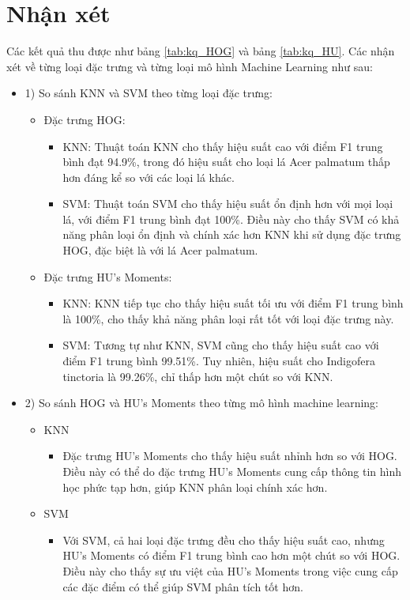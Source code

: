 \documentclass[a4paper]{article}
\begin{document}
\section{Nhận xét}
Các kết quả thu được như bảng \ref{tab:kq_HOG} và bảng \ref{tab:kq_HU}. Các nhận xét về từng loại đặc trưng và từng loại mô hình Machine Learning như sau:
\begin{itemize}[label={}]
    \item 1) So sánh KNN và SVM theo từng loại đặc trưng:
    \begin{itemize}[label={}]
        \item Đặc trưng HOG:
            \begin{itemize}[label={}]
                \item KNN: Thuật toán KNN cho thấy hiệu suất cao với điểm F1 trung bình đạt 94.9\%, trong đó hiệu suất cho loại lá Acer palmatum thấp hơn đáng kể so với các loại lá khác.
                \item SVM: Thuật toán SVM cho thấy hiệu suất ổn định hơn với mọi loại lá, với điểm F1 trung bình đạt 100\%. Điều này cho thấy SVM có khả năng phân loại ổn định và chính xác hơn KNN khi sử dụng đặc trưng HOG, đặc biệt là với lá Acer palmatum.
            \end{itemize}
        \item Đặc trưng HU's Moments:
            \begin{itemize}[label={}]
                \item KNN: KNN tiếp tục cho thấy hiệu suất tối ưu với điểm F1 trung bình là 100\%, cho thấy khả năng phân loại rất tốt với loại đặc trưng này.
                \item SVM: Tương tự như KNN, SVM cũng cho thấy hiệu suất cao với điểm F1 trung bình 99.51\%. Tuy nhiên, hiệu suất cho Indigofera tinctoria là 99.26\%, chỉ thấp hơn một chút so với KNN.
            \end{itemize}
    \end{itemize}
    \item 2) So sánh HOG và HU's Moments theo từng mô hình machine learning:
    \begin{itemize}[label={}]
        \item KNN
            \begin{itemize}[label={}]
                \item Đặc trưng HU's Moments cho thấy hiệu suất nhỉnh hơn so với HOG. Điều này có thể do đặc trưng HU's Moments cung cấp thông tin hình học phức tạp hơn, giúp KNN phân loại chính xác hơn.
            \end{itemize}
        \item SVM 
            \begin{itemize}[label={}]
                \item Với SVM, cả hai loại đặc trưng đều cho thấy hiệu suất cao, nhưng HU's Moments có điểm F1 trung bình cao hơn một chút so với HOG. Điều này cho thấy sự ưu việt của HU's Moments trong việc cung cấp các đặc điểm có thể giúp SVM phân tích tốt hơn.
            \end{itemize}
    \end{itemize}
\end{itemize}
\end{document}
